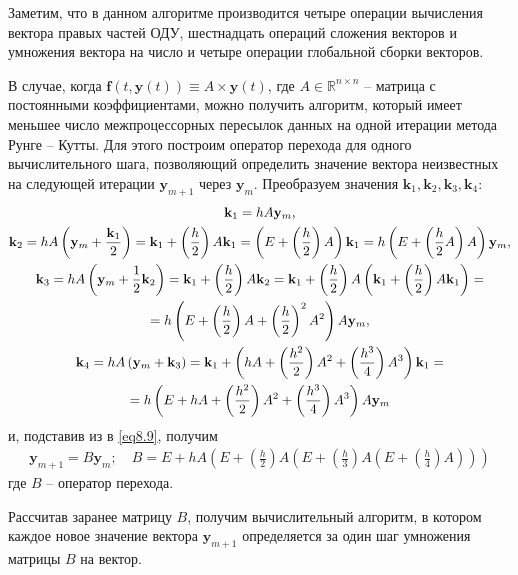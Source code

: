 \documentclass[14pt,final,titlepage,pscyr]{hedwork}
\renewcommand{\vec}[1]{\mathbf{#1}}
\begin{document}
Заметим, что в данном алгоритме производится четыре операции вычисления вектора правых частей ОДУ, 
шестнадцать операций сложения векторов и умножения вектора на число и четыре операции глобальной 
сборки векторов. 

В случае, когда \( \vec{f}(t, \vec{y}(t)) \equiv A \times \vec{y}(t) \), где 
\( A \in \mathbb{R}^{n\times n} \) -- матрица с постоянными коэффициентами, можно получить алгоритм, 
который имеет меньшее число межпроцессорных пересылок данных на одной итерации метода Рунге -- Кутты. 
Для этого построим оператор перехода для одного вычислительного шага, позволяющий определить 
значение вектора неизвестных на следующей итерации \( \vec{y}_{m+1} \) через \( \vec{y}_m \). 
Преобразуем значения \( \vec{k}_1, \vec{k}_2, \vec{k}_3, \vec{k}_4 \):
\begin{gather}
	\vec{k}_1 = hA\vec{y}_m, \notag \\
	\vec{k}_2 = hA\left(\vec{y}_m + \frac{\vec{k}_1}{2}\right) = 
		\vec{k}_1 + \left(\frac{h}{2}\right)A\vec{k}_1 = 
		\left( E + \left(\frac{h}{2}\right)A \right)\vec{k}_1 = 
		h\left( E + \left(\frac{h}{2}A \right)A \right) \vec{y}_m, \notag \\
	\vec{k}_3 = hA\left( \vec{y}_m + \frac{1}{2}\vec{k}_2 \right) = 
		\vec{k}_1 + \left( \frac{h}{2} \right)A\vec{k}_2 = 
		\vec{k}_1 + \left( \frac{h}{2} \right)A\left( \vec{k}_1 + 
		\left( \frac{h}{2} \right)A\vec{k}_1 \right) = \notag \\ =
		h\left( E + \left( \frac{h}{2} \right)A + \left( \frac{h}{2} \right)^2 A^2 \right)A\vec{y}_m, 
	\notag \\
	\vec{k}_4 = hA\left( \vec{y}_m + \vec{k}_3 \right) = 
		\vec{k}_1 + \left( hA + \left( \frac{h^2}{2} \right)A^2 + 
			\left( \frac{h^3}{4} \right)A^3 \right)\vec{k}_1 = \notag \\ = 
		h\left( E + hA + \left( \frac{h^2}{2} \right)A^2 + 
			\left( \frac{h^3}{4} \right)A^3 \right)A\vec{y}_m
	\notag
\end{gather}
и, подставив из в \eqref{eq8.9}, получим
\begin{gather}
	\vec{y}_{m+1} = B\vec{y}_m; \quad
	B = E + hA\left( E + \left( \frac{h}{2} \right)A\left( 
		E + \left( \frac{h}{3} \right) A \left( E + \left( \frac{h}{4} \right)A \right) 
	\right) \right)
	\label{eq8.10}
\end{gather}
где \( B \) -- оператор перехода.

Рассчитав заранее матрицу \( B \), получим вычислительный алгоритм, в котором каждое новое значение 
вектора \( \vec{y}_{m+1} \) определяется за один шаг умножения матрицы \( B \) на вектор.
\end{document}
